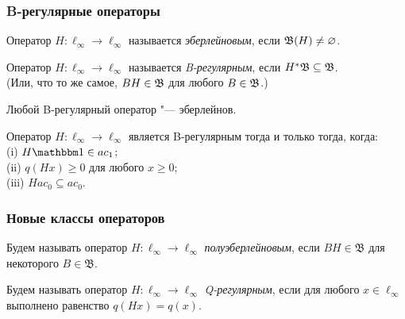 \begin{frame}\frametitle{B-регулярные операторы}
	\begin{ddefinition}
		Оператор $H : \ell_\infty \to \ell_\infty$ называется \emph{эберлейновым},
		если $\mathfrak{B}(H) \ne\varnothing$.
	\end{ddefinition}
	\begin{ddefinition}
		\label{def:B-regular_operator}
		Оператор $H : \ell_\infty \to \ell_\infty$ называется \emph{B-регулярным},
		если $H^*\mathfrak{B} \subseteq \mathfrak{B}$.
		\\
		(Или, что то же самое, $BH\in\mathfrak{B}$ для любого $B\in\mathfrak{B}$.)
	\end{ddefinition}
	\begin{ttheorem}
		\label{thm:B-regular_is_Eberlein}
		Любой B-регулярный оператор "--- эберлейнов.
	\end{ttheorem}
	\begin{ttheorem}
		Оператор $H:\ell_\infty \to \ell_\infty$ является B-регулярным тогда и только тогда, когда:
		\\(i) $H\one \in ac_1$;
		\\(ii) $q(Hx)\geq 0$ для любого $x\geq 0$;
		\\(iii) $H ac_0 \subseteq ac_0$.
	\end{ttheorem}
\end{frame}


\begin{frame}\frametitle{{Новые классы операторов}}
	\vfill
	\begin{ddefinition}
		Будем называть оператор $H:\ell_\infty \to \ell_\infty$ \emph{полуэберлейновым}, если $BH\in\mathfrak B$ для некоторого $B\in\mathfrak B$.
	\end{ddefinition}
	\vfill
	\begin{ddefinition}
		Будем называть оператор $H:\ell_\infty \to \ell_\infty$ \emph{Q-регулярным}, если
		для любого $x\in\ell_\infty$ выполнено равенство $q(Hx) = q(x)$.
	\end{ddefinition}
	\vfill
\end{frame}


